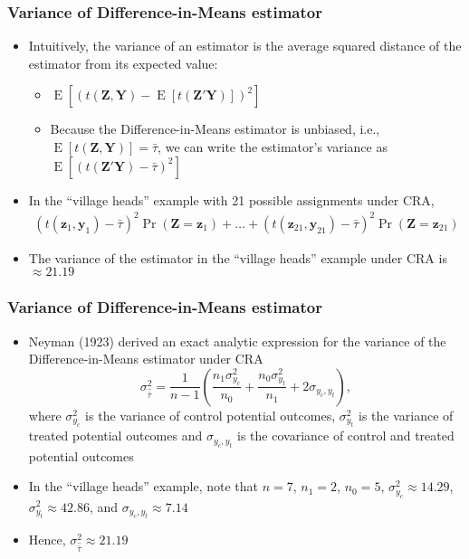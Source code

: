 \documentclass[table, xcolor={dvipsnames}, 9pt]{beamer}
\theoremstyle{newstyle}
\DeclareMathOperator{\E}{\mathrm{E}}
\begin{document}
\begin{frame}
\frametitle{Variance of Difference-in-Means estimator} 
\begin{itemize}
\item Intuitively, the variance of an estimator is the average squared distance of the estimator from its expected value: \pause 
\begin{itemize}
\item $\E\left[\left(t\left(\mathbf{Z}, \mathbf{Y}\right) - \E\left[t\left(\mathbf{Z}' \mathbf{Y}\right)\right]\right)^2\right]$ \pause 
\item Because the Difference-in-Means estimator is unbiased, i.e., $\E\left[t\left(\mathbf{Z}, \mathbf{Y}\right)\right] = \bar{\tau}$, we can write the estimator's variance as $\E\left[\left(t\left(\mathbf{Z}' \mathbf{Y}\right) - \bar{\tau}\right)^2\right]$
\end{itemize} \pause 
\item In the ``village heads'' example with 21 possible assignments under CRA, \pause 
\begin{align*}
\left(t\left(\mathbf{z}_1, \mathbf{y}_1\right) - \bar{\tau}\right)^2 \Pr\left(\mathbf{Z} = \mathbf{z}_1\right) + \ldots + \left(t\left(\mathbf{z}_{21}, \mathbf{y}_{21}\right) - \bar{\tau}\right)^2 \Pr\left(\mathbf{Z} = \mathbf{z}_{21}\right)
\end{align*} \pause 
\item The variance of the estimator in the ``village heads'' example under CRA is $\approx 21.19$
\end{itemize}
\end{frame}
\begin{frame}
\frametitle{Variance of Difference-in-Means estimator}
\begin{itemize}
\item Neyman (1923) derived an exact analytic expression for the variance of the Difference-in-Means estimator under CRA \pause 
\begin{equation}
\sigma^2_{\hat{\bar{\tau}}} = \frac{1}{n - 1}\left(\frac{n_1 \sigma^2_{y_c}}{n_0} + \frac{n_0 \sigma^2_{y_t}}{n_1} + 2\sigma_{y_c, y_t}\right),
\end{equation} \pause 
where $\sigma^2_{y_c}$ is the variance of control potential outcomes, \pause $\sigma^2_{y_t}$ is the variance of treated potential outcomes and \pause $\sigma_{y_c, y_t}$ is the covariance of control and treated potential outcomes \pause
\item In the ``village heads'' example, note that $n = 7$, $n_1 = 2$, $n_0 = 5$, $\sigma^2_{y_c} \approx 14.29$,  $\sigma^2_{y_t} \approx 42.86$, and $\sigma_{y_c, y_t} \approx 7.14$ \pause 
\item Hence, $\sigma^2_{\hat{\bar{\tau}}} \approx 21.19$
\end{itemize}
\end{frame}
\end{document}

